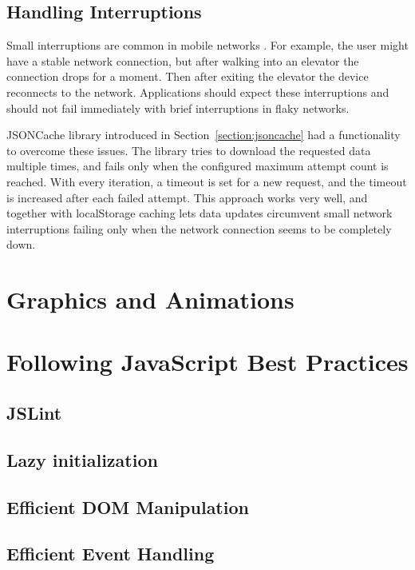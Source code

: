 \subsection{Handling Interruptions}

Small interruptions are common in mobile networks \citationneeded. For
example, the user might have a stable network connection, but after
walking into an elevator the connection drops for a moment. Then after
exiting the elevator the device reconnects to the
network. Applications should expect these interruptions and should not
fail immediately with brief interruptions in flaky networks.

JSONCache library introduced in Section~\ref{section:jsoncache} had a
functionality to overcome these issues. The library tries to download
the requested data multiple times, and fails only when the configured
maximum attempt count is reached. With every iteration, a timeout is
set for a new request, and the timeout is increased after each failed
attempt. This approach works very well, and together with localStorage
caching lets data updates circumvent small network interruptions
failing only when the network connection seems to be completely down.

\section{Graphics and Animations}
\label{section:graphics}

\section{Following JavaScript Best Practices}
\label{section:js-best-practices}

\subsection{JSLint}
\subsection{Lazy initialization}
\subsection{Efficient DOM Manipulation}
\subsection{Efficient Event Handling}

